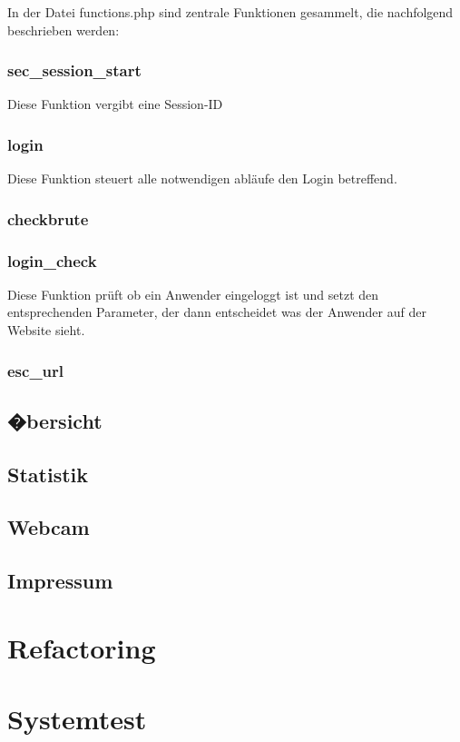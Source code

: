 In der Datei functions.php sind zentrale Funktionen gesammelt, die nachfolgend
beschrieben werden:

\subsubsection{sec\_session\_start}
Diese Funktion vergibt eine Session-ID

\subsubsection{login}
Diese Funktion steuert alle notwendigen abläufe den Login betreffend.

\subsubsection{checkbrute}

\subsubsection{login\_check}
Diese Funktion prüft ob ein Anwender eingeloggt ist und setzt den entsprechenden
Parameter, der dann entscheidet was der Anwender auf der Website sieht.

\subsubsection{esc\_url}


\subsection{�bersicht}

\subsection{Statistik}

\subsection{Webcam}

\subsection{Impressum}

\section{Refactoring}
\section{Systemtest}
